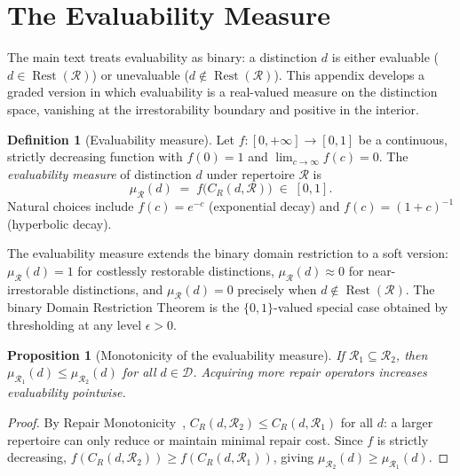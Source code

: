 \documentclass[12pt, oneside]{article}
\theoremstyle{plain}
\newtheorem{proposition}[theorem]{Proposition}
\theoremstyle{definition}
\newtheorem{definition}[theorem]{Definition}
\theoremstyle{remark}
\DeclareMathOperator{\Rest}{Rest}
\newcommand{\CR}{C_{\!R}}
\newcommand{\Dsub}{\mathcal{D}}
\newcommand{\RestR}{\Rest(\mathcal{R})}
\begin{document}
\section{The Evaluability Measure}
\label{app:measure}

The main text treats evaluability as binary: a distinction $d$ is
either evaluable ($d \in \RestR$) or unevaluable ($d \notin \RestR$).
This appendix develops a graded version in which evaluability is a
real-valued measure on the distinction space, vanishing at the
irrestorability boundary and positive in the interior.

\begin{definition}[Evaluability measure]
  Let $f: [0, +\infty] \to [0, 1]$ be a continuous, strictly
  decreasing function with $f(0) = 1$ and $\lim_{c \to \infty}
  f(c) = 0$.
  The \emph{evaluability measure} of distinction $d$ under
  repertoire $\mathcal{R}$ is
  \[
    \mu_{\mathcal{R}}(d)
    \;=\;
    f\!\bigl(\CR(d, \mathcal{R})\bigr)
    \;\in\; [0, 1].
  \]
  Natural choices include $f(c) = e^{-c}$ (exponential decay)
  and $f(c) = (1 + c)^{-1}$ (hyperbolic decay).
\end{definition}

The evaluability measure extends the binary domain restriction to
a soft version: $\mu_{\mathcal{R}}(d) = 1$ for costlessly
restorable distinctions, $\mu_{\mathcal{R}}(d) \approx 0$ for
near-irrestorable distinctions, and $\mu_{\mathcal{R}}(d) = 0$
precisely when $d \notin \RestR$.
The binary Domain Restriction Theorem is the $\{0,1\}$-valued
special case obtained by thresholding at any level $\epsilon > 0$.

\begin{proposition}[Monotonicity of the evaluability measure]
  If $\mathcal{R}_1 \subseteq \mathcal{R}_2$, then
  $\mu_{\mathcal{R}_1}(d) \leq \mu_{\mathcal{R}_2}(d)$
  for all $d \in \Dsub$.
  Acquiring more repair operators increases evaluability pointwise.
  \label{prop:measure-monotone}
\end{proposition}

\begin{proof}
  By Repair Monotonicity~\cite{Flyxion2026a},
  $\CR(d, \mathcal{R}_2) \leq \CR(d, \mathcal{R}_1)$ for all $d$:
  a larger repertoire can only reduce or maintain minimal repair cost.
  Since $f$ is strictly decreasing,
  $f(\CR(d, \mathcal{R}_2)) \geq f(\CR(d, \mathcal{R}_1))$,
  giving $\mu_{\mathcal{R}_2}(d) \geq \mu_{\mathcal{R}_1}(d)$.
\end{proof}
\end{document}
